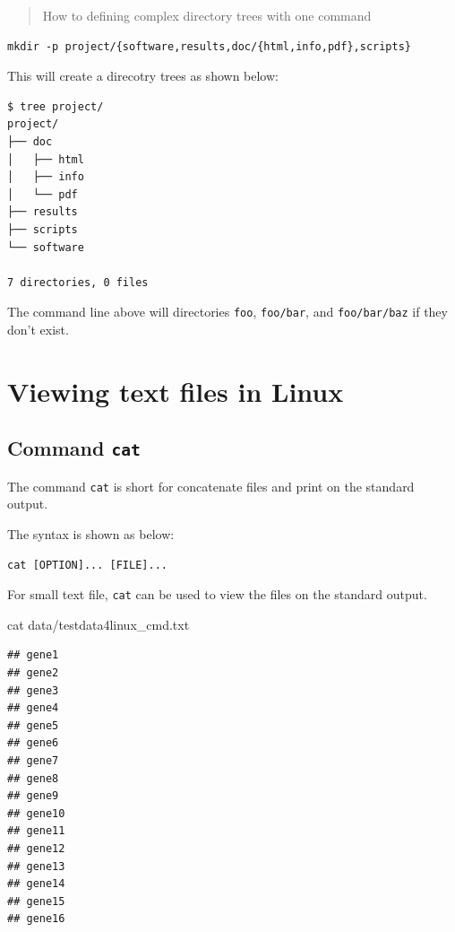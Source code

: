 \documentclass[]{book}
\makeatletter
\newenvironment{Shaded}{\begin{snugshade}}{\end{snugshade}}
\newcommand{\FunctionTok}[1]{\textcolor[rgb]{0.00,0.00,0.00}{#1}}
\newcommand{\NormalTok}[1]{#1}
\newenvironment{kframe}{%
\medskip{}
\setlength{\fboxsep}{.8em}
 \def\at@end@of@kframe{}%
 \ifinner\ifhmode%
  \def\at@end@of@kframe{\end{minipage}}%
  \begin{minipage}{\columnwidth}%
 \fi\fi%
 \def\FrameCommand##1{\hskip\@totalleftmargin \hskip-\fboxsep
 \colorbox{shadecolor}{##1}\hskip-\fboxsep
     \hskip-\linewidth \hskip-\@totalleftmargin \hskip\columnwidth}%
 \MakeFramed {\advance\hsize-\width
   \@totalleftmargin\z@ \linewidth\hsize
   \@setminipage}}%
 {\par\unskip\endMakeFramed%
 \at@end@of@kframe}
\renewenvironment{Shaded}{\begin{kframe}}{\end{kframe}}
\theoremstyle{definition}
\theoremstyle{definition}
\theoremstyle{definition}
\theoremstyle{remark}
\makeatother
\begin{document}
\begin{quote}
How to defining complex directory trees with one command
\end{quote}

\begin{verbatim}
mkdir -p project/{software,results,doc/{html,info,pdf},scripts}
\end{verbatim}

This will create a direcotry trees as shown below:

\begin{verbatim}
$ tree project/
project/
├── doc
│   ├── html
│   ├── info
│   └── pdf
├── results
├── scripts
└── software

7 directories, 0 files
\end{verbatim}

The command line above will directories \texttt{foo}, \texttt{foo/bar},
and \texttt{foo/bar/baz} if they don't exist.

\section{Viewing text files in Linux}\label{viewing-text-files-in-linux}

\subsection{\texorpdfstring{Command
\texttt{cat}}{Command cat}}\label{command-cat}

The command \texttt{cat} is short for concatenate files and print on the
standard output.

The syntax is shown as below:

\begin{verbatim}
cat [OPTION]... [FILE]...
\end{verbatim}

For small text file, \texttt{cat} can be used to view the files on the
standard output.

\begin{Shaded}
\begin{Highlighting}[]
\FunctionTok{cat}\NormalTok{ data/testdata4linux_cmd.txt}
\end{Highlighting}
\end{Shaded}

\begin{verbatim}
## gene1
## gene2
## gene3
## gene4
## gene5
## gene6
## gene7
## gene8
## gene9
## gene10
## gene11
## gene12
## gene13
## gene14
## gene15
## gene16
\end{verbatim}
\end{document}
